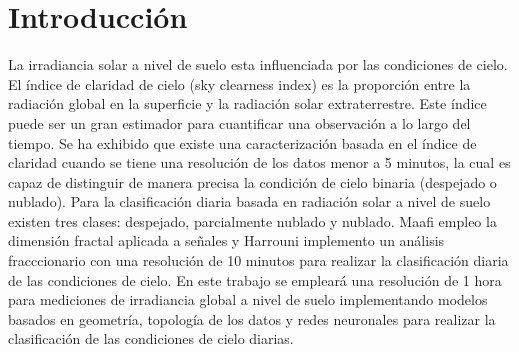 \section{Introducción}

La irradiancia solar a nivel de suelo esta influenciada por las condiciones  de cielo.  El índice de claridad de cielo (sky clearness index) es la proporción entre la radiación global en la superficie y la radiación solar extraterrestre\cite{Muhammad_1983}. Este índice puede ser un gran estimador para cuantificar una observación a lo largo del tiempo. Se ha exhibido que existe una caracterización basada en el índice de claridad cuando se tiene una resolución de los datos menor a 5 minutos\cite{Suehrcke_1988,Skartveit_1992,Jurado_1995}, la cual es capaz de distinguir de manera precisa la condición de cielo binaria (despejado o nublado). Para la clasificación diaria basada en radiación solar a nivel de suelo existen tres clases: despejado, parcialmente nublado y nublado. Maafi\cite{Maafi_2003} empleo la dimensión fractal aplicada a señales y Harrouni\cite{Harrouni_2005} implemento un análisis fracccionario con una resolución de 10 minutos para realizar la clasificación diaria de las condiciones de cielo. En este trabajo se empleará una resolución de 1 hora para mediciones de irradiancia global a nivel de suelo implementando modelos basados en geometría, topología de los datos y redes neuronales para realizar la clasificación de las condiciones de cielo diarias.
